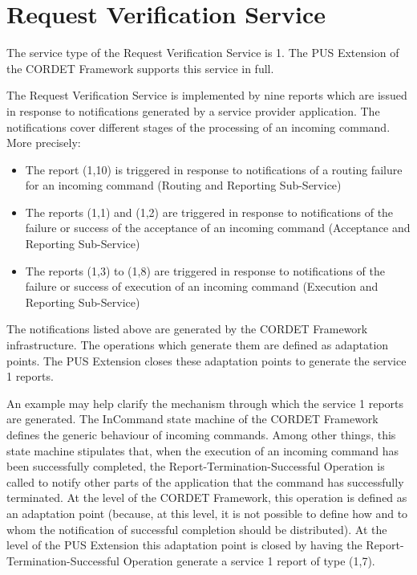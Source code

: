 \documentclass{pnp_article}
\begin{document}
\newpage
{}









\section{Request Verification Service}\label{sec:serv1}
The service type of the Request Verification Service is 1. The PUS Extension of the CORDET Framework supports this service in full.

The Request Verification Service is implemented by nine reports which are issued  in response to notifications generated by a service provider application. The notifications cover different stages of the processing of an incoming command. More precisely:

\begin{itemize}
\item The report (1,10) is triggered in response to notifications of a routing failure for an incoming command (Routing and Reporting Sub-Service)
\item The reports (1,1) and (1,2) are triggered in response to notifications of the failure or success of the acceptance of an incoming command (Acceptance and Reporting Sub-Service)
\item The reports (1,3) to (1,8) are triggered in response to notifications of the failure or success of execution of an incoming command (Execution and Reporting Sub-Service)
\end{itemize}

The notifications listed above are generated by the CORDET Framework infrastructure. The operations which generate them are defined as adaptation points. The PUS Extension closes these adaptation points to generate the service 1 reports. 

An example may help clarify the mechanism through which the service 1 reports are generated. The InCommand state machine of the CORDET Framework defines the generic behaviour of incoming commands. Among other things, this state machine stipulates that, when the execution of an incoming command has been successfully completed, the Report-Termination-Successful Operation is called to notify other parts of the application that the command has successfully terminated. At the level of the CORDET Framework, this operation is defined as an adaptation point (because, at this level, it is not possible to define how and to whom the notification of successful completion should be distributed). At the level of the PUS Extension this adaptation point is closed by having the Report-Termination-Successful Operation generate a service 1 report of type (1,7).
\end{document}
